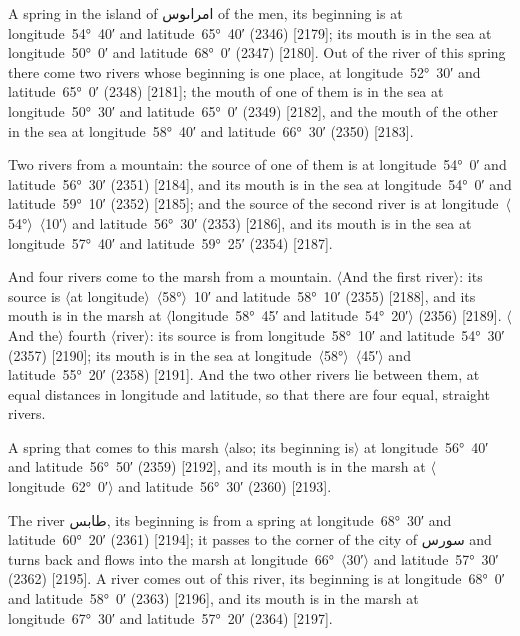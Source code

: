 \documentclass[11pt]{article}
\newcommand{\Pg}[1]{\marginpar{\footnotesize #1}}
\newcommand{\Ang}[1]{\ensuremath{#1}}
\begin{document}
A spring in the island of \textarabic{امراٮوس} of the men, its beginning is at longitude~54°~40′ and latitude~65°~40′ (2346) [2179]; its mouth is in the sea at longitude~50°~0′ and latitude~68°~0′ (2347) [2180]. Out of the river of this spring there come two rivers whose beginning is one place, at longitude~52°~30′ and latitude~65°~0′ (2348) [2181]; the mouth of one of them is in the sea at longitude~50°~30′ and latitude~65°~0′ (2349) [2182], and the mouth of the other in the sea at longitude~58°~40′ and latitude~66°~30′ (2350) [2183].

Two rivers from a mountain: the source of one of them is at longitude~54°~0′ and latitude~56°~30′ (2351) [2184], and its mouth is in the sea at longitude~54°~0′ and latitude~59°~10′ (2352) [2185]; and the source of the second river is at longitude~\Ang{\langle}54°\Ang{\rangle}~\Ang{\langle}10′\Ang{\rangle} and latitude~56°~30′ (2353) [2186], and its mouth is in the sea at longitude~57°~40′ and latitude~59°~25′ (2354) [2187].

\Pg{p. 155}And four rivers come to the marsh from a mountain. \Ang{\langle}And the first river\Ang{\rangle}: its source is \Ang{\langle}at longitude\Ang{\rangle}~\Ang{\langle}58°\Ang{\rangle}~10′ and latitude~58°~10′ (2355) [2188], and its mouth is in the marsh at \Ang{\langle}longitude~58°~45′ and latitude~54°~20′\Ang{\rangle} (2356) [2189]. \Ang{\langle}And the\Ang{\rangle} fourth \Ang{\langle}river\Ang{\rangle}: its source is from longitude~58°~10′ and latitude~54°~30′ (2357) [2190]; its mouth is in the sea at longitude~\Ang{\langle}58°\Ang{\rangle}~\Ang{\langle}45′\Ang{\rangle} and latitude~55°~20′ (2358) [2191]. And the two other rivers lie between them, at equal distances in longitude and latitude, so that there are four equal, straight rivers.

A spring that comes to this marsh \Ang{\langle}also; its beginning is\Ang{\rangle} at longitude~56°~40′ and latitude~56°~50′ (2359) [2192], and its mouth is in the marsh at \Ang{\langle}longitude~62°~0′\Ang{\rangle} and latitude~56°~30′ (2360) [2193].

The river \textarabic{طابس}, its beginning is from a spring at longitude~68°~30′ and latitude~60°~20′ (2361) [2194]; it passes to the corner of the city of \textarabic{سورس} and turns back and flows into the marsh at longitude~66°~\Ang{\langle}30′\Ang{\rangle} and latitude~57°~30′ (2362) [2195]. A river comes out of this river, its beginning is at longitude~68°~0′ and latitude~58°~0′ (2363) [2196], and its mouth is in the marsh at longitude~67°~30′ and latitude~57°~20′ (2364) [2197].
\end{document}
